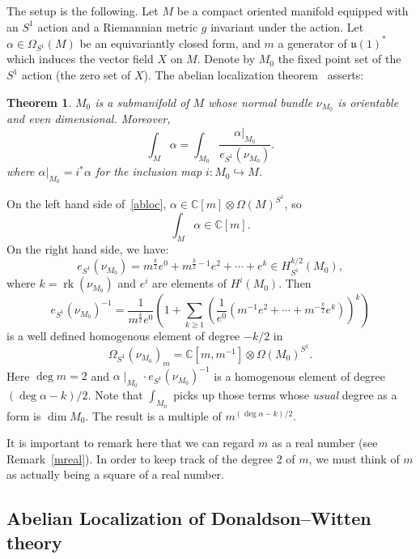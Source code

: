 \documentclass[a4paper,12pt,reqno,sumlimits]{amsart}
\theoremstyle{plain}
\newtheorem{thm}{Theorem}
\theoremstyle{definition}
\newcommand{\C}{{\mathbb C}}
\newcommand{\1}{{\bf 1}}
\newcommand{\uu}{{\mathfrak  u}}
\newcommand{\inc}{\hookrightarrow}
\newcommand{\rk}{{\operatorname{rk}}}
\newcommand{\inv}{^{-1}}
\numberwithin{equation}{section}
\begin{document}
The setup is the following.  Let $M$ be a compact oriented manifold equipped
with an $S^1$ action and a Riemannian metric $g$ invariant under the action.
Let $\alpha\in\Omega_{S^1}(M)$ be an equivariantly closed form, and $m$ a
generator of $\uu(1)^*$ which induces the vector field $X$ on $M$.  Denote by
$M_0$ the fixed point set of the $S^1$ action (the zero set of $X$).  The
abelian localization theorem~\cite[Theorem 7.13]{bgv} asserts:
\begin{thm}
  $M_0$ is a submanifold of $M$ whose normal bundle $\nu_{M_0}$ is
  orientable and even dimensional. Moreover,
  \begin{equation}
    \label{abloc}
    \int_M\alpha=\int_{M_0}\frac{\alpha\big|_{M_0}}{e_{S^1}(\nu_{M_0})}.
  \end{equation}
  where $\alpha\big|_{M_0}=i^*\alpha$ for the inclusion map $i:M_0\inc M$.
\end{thm}
On the left hand side of~\eqref{abloc}, 
$\alpha\in\C[m]\otimes\Omega(M)^{S^1}$, so 
$$
\int_M\alpha\in\C[m].
$$
On the right hand side, we have:
$$
e_{S^1}(\nu_{M_0})=m^{\frac{k}{2}}e^0 + m^{\frac{k}{2}-1}e^2 +\cdots+ e^k
\in H_{S^1}^{k/2}(M_0),
$$
where $k=\rk(\nu_{M_0})$ and $e^i$ are elements of $H^i(M_0)$.
Then
$$
e_{S^1}(\nu_{M_0})\inv=\frac{1}{m^{\frac{k}{2}}e^0}\left(
  1+\sum_{k\ge 1}\left(\frac{1}{e^0}(m\inv e^2+\cdots+m^{-\frac{k}{2}}e^k)
  \right)^k\right)
$$
is a well defined homogenous element of degree $-k/2$ in
$$
\Omega_{S^1}(\nu_{M_0})_m=\C[m,m\inv]\otimes\Omega(M_0)^{S^1}.
$$
Here $\deg{m}=2$ and $\alpha\mid_{M_0}\cdot e_{S^1}(\nu_{M_0})\inv$ is a
homogenous element of degree $(\deg{\alpha}-k)/2.$ Note that
$\displaystyle\int_{M_0}$ picks up those terms whose {\em usual} degree as a
form is $\dim{M_0}$. The result is a multiple of $m^{(\deg{\alpha}-k)/2}.$

It is important to remark here that we can regard $m$ as a real number (see
Remark~\ref{mreal}). In order to keep track of the degree 2 of $m$, we must
think of $m$ as actually being a square of a real number.


\subsection{Abelian Localization of Donaldson--Witten theory}
\label{dwabloc}
\end{document}
